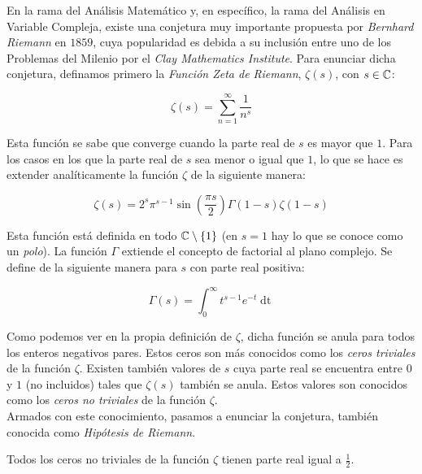En la rama del Análisis Matemático y, en específico, la rama del Análisis en Variable Compleja, existe una conjetura muy importante propuesta por \textit{Bernhard Riemann} en $1859$, cuya popularidad es debida a su inclusión entre uno de los Problemas del Milenio por el \textit{Clay Mathematics Institute}. Para enunciar dicha conjetura, definamos primero la \textit{Función Zeta de Riemann}, $\zeta(s)$, con $s \in \mathbb{C}$:

\begin{equation}\label{funcion_zeta_de_riemann}
\zeta(s) = \sum_{n=1}^{\infty}\frac{1}{n^s}
\end{equation}

Esta función se sabe que converge cuando la parte real de $s$ es mayor que $1$. Para los casos en los que la parte real de $s$ sea menor o igual que $1$, lo que se hace es extender analíticamente la función $\zeta$ de la siguiente manera:

\begin{equation}\label{funcion_zeta_de_riemann_extendida}
\zeta(s) = 2^s\pi^{s-1}\sin\left(\frac{\pi s}{2}\right)\Gamma(1-s)\zeta(1-s)
\end{equation}

Esta función está definida en todo $\mathbb{C} \setminus \{1\}$ (en $s = 1$ hay lo que se conoce como un \textit{polo}). La función $\Gamma$ extiende el concepto de factorial al plano complejo. Se define de la siguiente manera para $s$ con parte real positiva:

\begin{equation}
\Gamma(s) = \int_{0}^{\infty}t^{s-1}e^{-t}\mathop{dt}
\end{equation}

Como podemos ver en la propia definición de $\zeta$, dicha función se anula para todos los enteros negativos pares. Estos ceros son más conocidos como los \textit{ceros triviales} de la función $\zeta$. Existen también valores de $s$ cuya parte real se encuentra entre $0$ y $1$ (no incluidos) tales que $\zeta(s)$ también se anula. Estos valores son conocidos como los \textit{ceros no triviales} de la función $\zeta$.\\

Armados con este conocimiento, pasamos a enunciar la conjetura, también conocida como \textit{Hipótesis de Riemann}.

\begin{conjetura}\label{hipotesis_de_riemann}
	Todos los ceros no triviales de la función $\zeta$ tienen parte real igual a $\frac{1}{2}$.
\end{conjetura}

